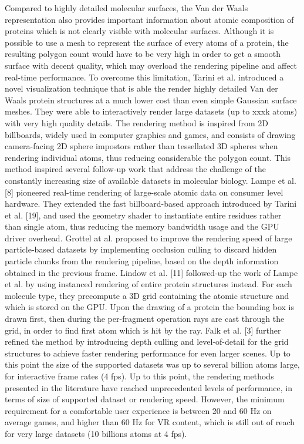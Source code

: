 Compared to highly detailed molecular surfaces, the Van der Waals representation also provides important information about atomic composition of proteins which is not clearly visible with molecular surfaces.
Although it is possible to use a mesh to represent the surface of every atoms of a protein, the resulting polygon count would have to be very high in order to get a smooth surface with decent quality, which may overload the rendering pipeline and affect real-time performance.
To overcome this limitation, Tarini et al. introduced a novel visualization technique that is able the render highly detailed Van der Waals protein structures at a much lower cost than even simple Gaussian surface meshes.
They were able to interactively render large datasets (up to xxxk atoms) with very high quality details.
The rendering method is inspired from 2D billboards, widely used in computer graphics and games, and consists of drawing camera-facing 2D sphere impostors rather than tessellated 3D spheres when rendering individual atoms, thus reducing considerable the polygon count.
This method inspired several follow-up work that address the challenge of the constantly increasing size of available datasets in molecular biology.
Lampe et al. [8] pioneered real-time rendering of large-scale atomic data on consumer level hardware. 
They extended the fast billboard-based approach introduced by Tarini et al. [19], and used the geometry shader to instantiate entire residues rather than single atom, thus reducing the memory bandwidth usage and the GPU driver overhead. 
Grottel at al. proposed to improve the rendering speed of large particle-based datasets by implementing occlusion culling to discard hidden particle chunks from the rendering pipeline, based on the depth information obtained in the previous frame.
Lindow et al. [11] followed-up the work of Lampe et al. by using instanced rendering of entire protein structures instead. 
For each molecule type, they precompute a 3D grid containing the atomic structure and which is stored on the GPU.
Upon the drawing of a protein the bounding box is drawn first, then during the per-fragment operation rays are cast through the grid, in order to find first atom which is hit by the ray.
Falk et al. [3] further refined the method by introducing depth culling and level-of-detail for the grid structures to achieve faster rendering performance for even larger scenes.
Up to this point the size of the supported datasets was up to several billion atoms large, for interactive frame rates (4 fps).
Up to this point, the rendering methods presented in the literature have reached unprecedented levels of performance, in terms of size of supported dataset or rendering speed.
However, the minimum requirement for a comfortable user experience is between 20 and 60 Hz on average games, and higher than 60 Hz for VR content, which is still out of reach for very large datasets (10 billions atoms at 4 fps).

